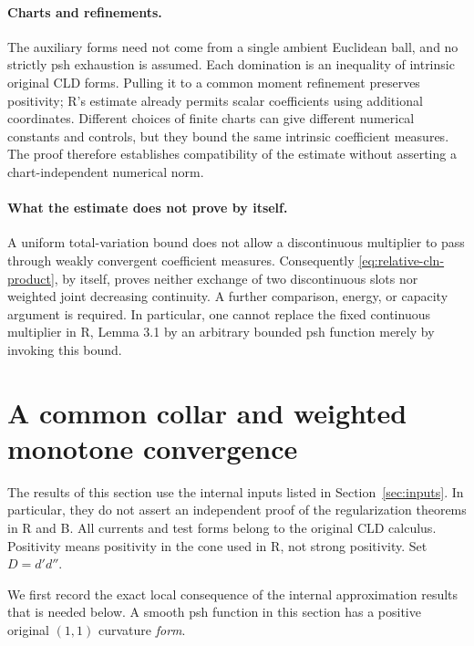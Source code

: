 \documentclass[11pt,a4paper]{article}
\numberwithin{equation}{section}
\theoremstyle{definition}
\theoremstyle{remark}
\begin{document}
\paragraph{Charts and refinements.}
The auxiliary forms need not come from a single ambient Euclidean ball,
and no strictly psh exhaustion is assumed. Each domination is an
inequality of intrinsic original CLD forms. Pulling it to a common
moment refinement preserves positivity; R's estimate already permits
scalar coefficients using additional coordinates. Different choices
of finite charts can give different numerical constants and controls,
but they bound the same intrinsic coefficient measures. The proof
therefore establishes compatibility of the estimate without asserting
a chart-independent numerical norm.

\paragraph{What the estimate does not prove by itself.}
A uniform total-variation bound does not allow a discontinuous
multiplier to pass through weakly convergent coefficient measures.
Consequently \eqref{eq:relative-cln-product}, by itself, proves neither
exchange of two discontinuous slots nor weighted joint decreasing
continuity. A further comparison, energy, or capacity argument is
required. In particular, one cannot replace the fixed continuous
multiplier in R, Lemma 3.1 by an arbitrary bounded psh function merely
by invoking this bound.




\section{A common collar and weighted monotone convergence}
\label{sec:monotone}

The results of this section use the internal inputs listed in
Section~\ref{sec:inputs}. In particular, they do not assert an independent
proof of the regularization theorems in \textup{R} and \textup{B}.
All currents and test forms belong to the original CLD calculus.
Positivity means positivity in the cone used in \textup{R}, not strong
positivity. Set $D=d'd''$.

We first record the exact local consequence of the internal approximation
results that is needed below. A smooth psh function in this section has a
positive original $(1,1)$ curvature \emph{form}.
\end{document}
